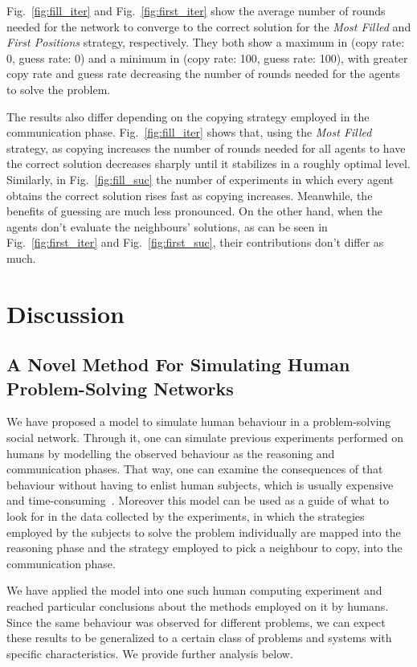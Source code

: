 \documentclass{article}
\begin{document}
Fig.~\ref{fig:fill_iter} and Fig.~\ref{fig:first_iter} show the average number of rounds needed for the network to converge to the correct solution for the \emph{Most Filled} and \emph{First Positions} strategy, respectively. They both show a maximum in (copy rate: 0, guess rate: 0) and a minimum in (copy rate: 100, guess rate: 100), with greater copy rate and guess rate decreasing the number of rounds needed for the agents to solve the problem.

The results also differ depending on the copying strategy employed in the communication phase. Fig.~\ref{fig:fill_iter} shows that, using the \emph{Most Filled} strategy, as copying increases the number of rounds needed for all agents to have the correct solution decreases sharply until it stabilizes in a roughly optimal level. Similarly, in Fig.~\ref{fig:fill_suc} the number of experiments in which every agent obtains the correct solution rises fast as copying increases. Meanwhile, the benefits of guessing are much less pronounced. On the other hand, when the agents don't evaluate the neighbours' solutions, as can be seen in Fig.~\ref{fig:first_iter} and Fig.~\ref{fig:first_suc}, their contributions don't differ as much.

\section{Discussion}
\label{sec:discuss}

\subsection{A Novel Method For Simulating Human Problem-Solving Networks}

We have proposed a model to simulate human behaviour in a problem-solving social network. Through it, one can simulate previous experiments performed on humans by modelling the observed behaviour as the reasoning and communication phases. That way, one can examine the consequences of that behaviour without having to enlist human subjects, which is usually expensive and time-consuming~\cite{?}. Moreover this model can be used as a guide of what to look for in the data collected by the experiments, in which the strategies employed by the subjects to solve the problem individually are mapped into the reasoning phase and the strategy employed to pick a neighbour to copy, into the communication phase.

We have applied the model into one such human computing experiment and reached particular conclusions about the methods employed on it by humans. Since the same behaviour was observed for different problems, we can expect these results to be generalized to a certain class of problems and systems with specific characteristics. We provide further analysis below.
\end{document}
